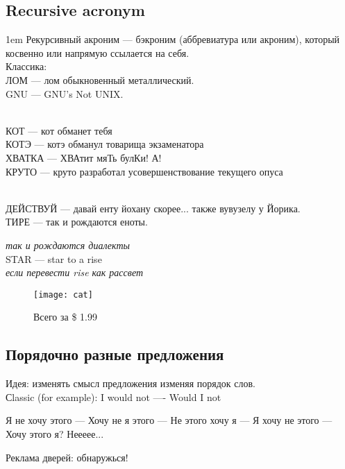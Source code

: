 \subsection{Recursive acronym}
\begin{flushleft}\parskip1em
    Рекурсивный акроним --- бэкроним (аббревиатура или акроним), который косвенно или напрямую ссылается на себя.\\
    Классика:\\
    ЛОМ --- лом обыкновенный металлический.\\
    GNU --- GNU's Not UNIX.

    \emph{}\\
    КОТ --- кот обманет тебя\\
    КОТЭ --- котэ обманул товарища экзаменатора\\
    ХВАТКА --- ХВАтит мяТь булКи! А!\\
    КРУТО --- круто разработал усовершенствование текущего опуса

    \emph{}\\
    ДЕЙСТВУЙ --- давай енту йохану скорее... также вувузелу у Йорика.\\
    ТИРЕ --- так и рождаются еноты.

    \emph{так и рождаются диалекты}\\
    STAR --- star to a rise\\
    \emph{если перевести rise как рассвет}
\end{flushleft}
\begin{figure}[ht!]
    \centering
    \texttt{[image: cat]}
    \caption{Всего за \$ 1.99}
\end{figure}

\subsection{Порядочно разные предложения}
Идея: изменять смысл предложения изменяя порядок слов.\\

Сlassic (for example): I would not —- Would I not


Я не хочу этого --- Хочу не я этого --- Не этого хочу я --- Я хочу не этого --- Хочу этого я? Неееее...


Реклама дверей: обнаружься! %
